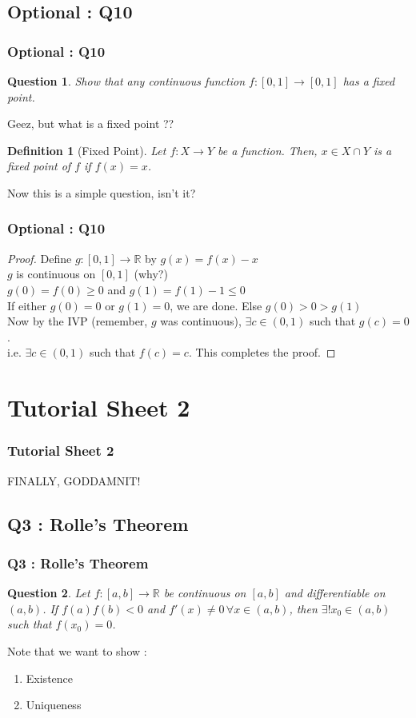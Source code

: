 \documentclass[handout,aspectratio=169]{beamer}
\newtheorem{df}{Definition}
\newtheorem{qsn}{Question}
\newcommand{\bR}{\mathbb{R}}
\begin{document}
\subsection{Optional : Q10}

\begin{frame}
\frametitle{Optional : Q10}
\pause
\begin{qsn}
Show that any continuous function $f : [0,1] \to [0,1]$ has a fixed point.
\end{qsn}
\pause
Geez, but what is a fixed point ??
\pause
\begin{df}[Fixed Point]
Let $f:X\to Y$ be a function. Then, $x\in X\cap Y$ is a fixed point of $f$ if $f(x)=x$. 
\end{df}
\pause
Now this is a simple question, isn't it?
\end{frame}

\begin{frame}
\frametitle{Optional : Q10}
\begin{proof}
\pause
Define $g : [0,1] \to \bR$ by $g(x) = f(x)-x$ \\ \pause
$g$ is continuous on $[0,1]$ (why?) \\ \pause
$g(0) = f(0) \geq 0$ and $g(1) = f(1)-1 \leq 0$ \\ \pause
If either $g(0)=0$ or $g(1)=0$, we are done. Else $g(0)>0>g(1)$ \\ \pause
Now by the IVP (remember, $g$ was continuous), $\exists c \in (0,1)$ such that $g(c) = 0$.\\ \pause
i.e. $\exists c \in (0,1)$ such that $f(c)=c$. This completes the proof.
\end{proof}
\end{frame}

\section{Tutorial Sheet 2}

\begin{frame}
\frametitle{Tutorial Sheet 2}
FINALLY, GODDAMNIT!
\end{frame}

\subsection{Q3 : Rolle's Theorem}

\begin{frame}
\frametitle{Q3 : Rolle's Theorem}
\begin{qsn}
Let $f : [a,b] \to \bR$ be continuous on $[a,b]$ and differentiable on $(a,b)$. If $f(a)f(b)<0$ and $f'(x)\neq 0 \, \forall x \in (a,b)$, then $\exists ! x_0 \in (a,b)$ such that $f(x_0)=0$.
\end{qsn}
\pause
Note that we want to show :
\pause 
\begin{enumerate}
\item Existence \pause
\item Uniqueness
\end{enumerate}
\end{frame}
\end{document}
